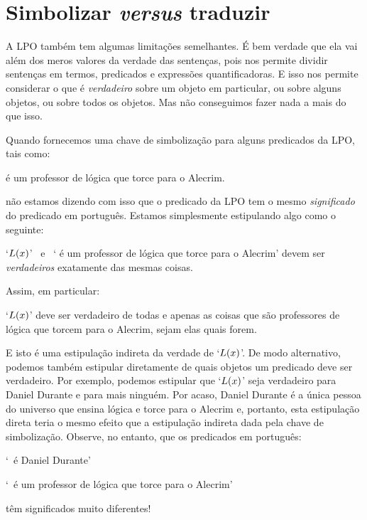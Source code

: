 \section{Simbolizar \emph{versus} traduzir}
A LPO também tem algumas limitações semelhantes.
É bem verdade que ela vai além dos meros valores da verdade das sentenças, pois nos permite dividir sentenças em termos, predicados e expressões quantificadoras.
E isso nos permite considerar o que é \emph{verdadeiro} sobre um objeto em particular, ou sobre alguns objetos, ou sobre todos os objetos.
Mas não conseguimos fazer nada a mais do que isso.

Quando fornecemos uma chave de simbolização para alguns predicados da LPO, tais como:
	\begin{ekey}
		\item[\atom{L}{x}]  é um professor de lógica que torce para o Alecrim.
	\end{ekey} 
não estamos dizendo com isso que o predicado da LPO tem o mesmo  \emph{significado} do predicado em português.
Estamos simplesmente estipulando algo como o seguinte:
	\begin{ebullet}
		\item `$\mathord{L}(x)$' \ e \ `  é um professor de lógica que torce para o Alecrim' devem ser \emph{verdadeiros} exatamente das mesmas coisas.
	\end{ebullet}
Assim, em particular:
	\begin{ebullet}
		\item `$\mathord{L}(x)$' deve ser verdadeiro de todas e apenas as coisas que são professores de lógica que torcem para o Alecrim, sejam elas quais forem.
	\end{ebullet}
E isto é uma estipulação indireta da verdade de `$\mathord{L}(x)$'.
De modo alternativo, podemos também estipular diretamente de quais objetos um predicado deve ser verdadeiro.
Por exemplo, podemos estipular que `$\mathord{L}(x)$' seja verdadeiro para Daniel Durante e para mais ninguém.
Por acaso, Daniel Durante é a única pessoa do universo que ensina lógica e torce para o Alecrim e, portanto, esta estipulação direta teria o mesmo efeito que a estipulação indireta dada pela chave de simbolização.
Observe, no entanto, que os predicados em português:
\begin{earg}
	\item[] `\blank\ é Daniel Durante'
	\item[] `\blank\ é um professor de lógica que torce para o Alecrim'
\end{earg}
têm significados muito diferentes!

